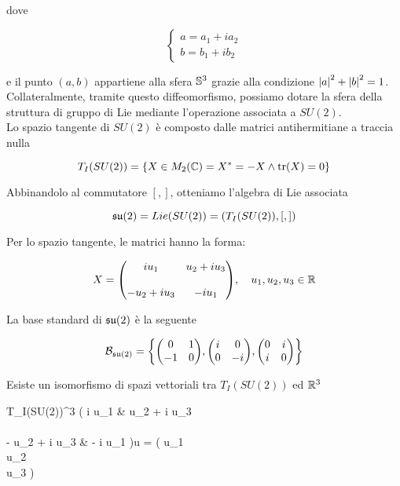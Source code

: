dove

\begin{equation}
	\begin{cases}
		a = a_{1} + i a_{2}\\
		b = b_{1} + i b_{2}
	\end{cases}
\end{equation}

e il punto $ (a,b) $ appartiene alla sfera $ \S^{3} $ grazie alla condizione $ \abs{a}^{2} + \abs{b}^{2} = 1 $.\\
Collateralmente, tramite questo diffeomorfismo, possiamo dotare la sfera della struttura di gruppo di Lie mediante l'operazione associata a $ SU(2) $.\\
Lo spazio tangente di $ SU(2) $ è composto dalle matrici antihermitiane a traccia nulla

\begin{equation}
	T_{I}(SU(2)) = \{X \in M_{2}(\C) = X^{*} = -X \wedge \tr(X) = 0 \}
\end{equation}

Abbinandolo al commutatore $ [,] $, otteniamo l'algebra di Lie associata

\begin{equation}
	\su(2) = Lie(SU(2)) = (T_{I}(SU(2)),[,])
\end{equation}

Per lo spazio tangente, le matrici hanno la forma:

\begin{equation}
	X = \mqty( i u_{1} & u_{2} + i u_{3} \\\\ - u_{2} + i u_{3} & - i u_{1} ) \qcomma u_{1},u_{2},u_{3} \in \R
\end{equation}

La base standard di $ \su(2) $ è la seguente

\begin{equation}
	\B_{\su(2)} = \left\{ %
		\mqty( 0 & 1 \\ -1 & 0 ), %
		\mqty( i & 0 \\ 0 & -i ), %
		\mqty( 0 & i \\ i & 0 ) %
		\right\}
\end{equation}

Esiste un isomorfismo di spazi vettoriali tra $ T_{I}(SU(2)) $ ed $ \R^{3} $

\map{\psi}%
	{T_{I}(SU(2))}{\R^{3}}%
	{\mqty( i u_{1} & u_{2} + i u_{3} \\\\ - u_{2} + i u_{3} & - i u_{1} )}{u = \mqty( u_{1} \\ u_{2} \\ u_{3} )}

